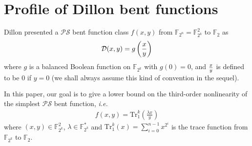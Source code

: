 \documentclass[runningheads,a4paper]{article}
\newcommand{\F}{\mathbb{F}}
\newcommand{\0}{\textbf{0}}
\newcommand{\1}{\textbf{1}}
\renewcommand{\tr}{\mathrm{Tr}_1^k}
\begin{document}
\section{Profile of Dillon bent functions}



Dillon presented a $\mathcal{PS}$ bent function class $f(x,y)$ from $\F_{2^n}=\F_{2^k}^2$ to $\F_2$ as
\begin{eqnarray*}\label{Eqn_PS_bent}
\mathcal{D}(x,y)=g\left({x\over y}\right)
\end{eqnarray*}
where $g$ is a balanced Boolean function on $\F_{2^{k}}$ with $g(0)=0$, and ${x\over y}$ is defined to be $0$ if $y=0$ (we shall
always assume this kind of convention in the sequel).

In this paper, our goal is to give a lower bound on the third-order nonlinearity of the simplest $\mathcal{PS}$ bent function, \emph{i.e.}
\begin{eqnarray}\label{sub-bent}
f(x,y)=\tr(\frac{\lambda x}{y})
\end{eqnarray}
where $(x,y)\in\F_{2^k}^2$, $\lambda\in\F_{2^k}^{*}$ and $\tr(x)=\sum\limits_{i=0}^{n-1}x^{2^i}$ is the trace function from
$\F_{2^k}$ to $\F_2$.
\end{document}
